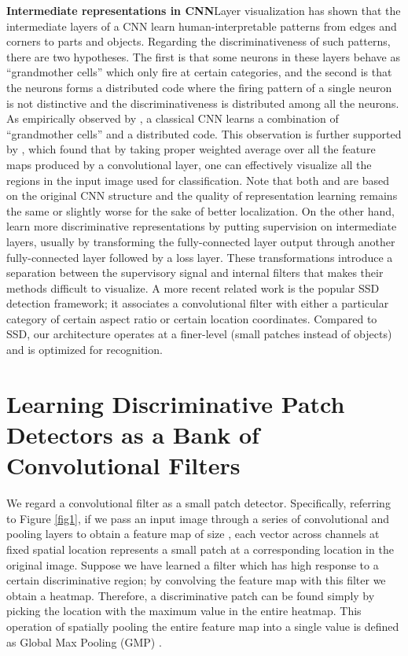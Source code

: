 \documentclass[10pt,twocolumn,letterpaper]{article}
\begin{document}
\noindent\textbf{Intermediate representations in CNN}\quad Layer visualization \cite{fergus14} has shown that the
intermediate layers of a CNN
learn human-interpretable patterns from edges and corners to parts and objects. Regarding the discriminativeness of such
patterns, there are two hypotheses. The first is that some neurons in these layers behave as ``grandmother cells''
which only fire at certain categories, and the second is that the neurons forms a distributed code where the firing
pattern of a single neuron is not distinctive and the discriminativeness is distributed among all the neurons. As
empirically observed by \cite{grandmacell}, a classical CNN learns a combination of ``grandmother cells'' and a
distributed code. This observation is further supported by \cite{bolei}, which found that by taking proper weighted
average over all the feature maps produced by a convolutional layer, one can effectively visualize all the regions
in the input image used for classification. Note that both \cite{grandmacell} and \cite{bolei} are based on the original CNN
structure and the quality of representation learning remains the same or slightly worse for the sake of better
localization. On the other hand, \cite{dsn, lcnn, cite_lcnn} learn more discriminative representations by putting 
supervision on intermediate layers, usually by transforming the fully-connected layer output through another fully-connected layer followed by
a loss layer. These transformations introduce a separation between the supervisory signal and internal filters that makes
their methods difficult to
visualize. A more recent related work is the popular SSD \cite{ssd} detection framework; it associates a
convolutional filter with either a particular category of certain aspect ratio or certain location coordinates. Compared
to SSD, our architecture operates at a finer-level (small patches instead of objects) and is optimized for recognition.

\section{Learning Discriminative Patch Detectors as a Bank of Convolutional Filters} \label{sec3}
We regard a  convolutional
filter as a small patch detector. Specifically, referring to Figure \ref{fig1}, if we pass an input
image through a series of convolutional and pooling layers to obtain a feature map of size , 
each  vector across channels at fixed spatial location represents a small
patch at a corresponding location in the original image. Suppose we have learned a  filter which has high
response to a certain discriminative region; by convolving the feature map with this filter we obtain a heatmap.
Therefore, a
discriminative patch can be found simply by picking the location with the maximum value in the entire heatmap. This operation of
spatially pooling the entire feature map into a single value is defined as Global Max Pooling (GMP) \cite{bolei}.
\end{document}
